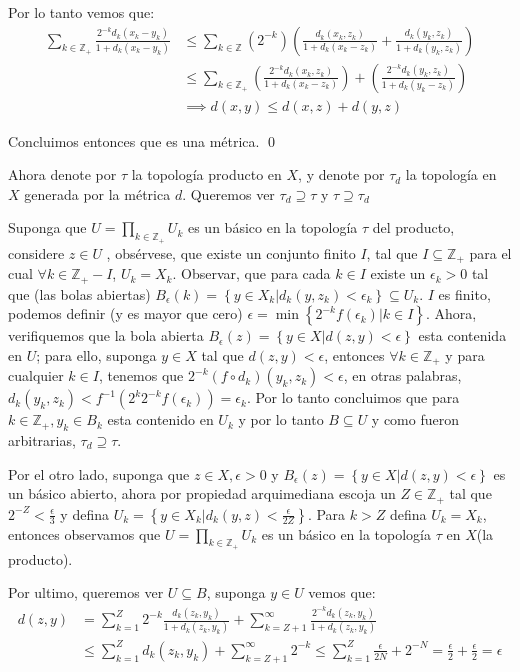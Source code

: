 \documentclass[]{article}
\newcommand{\lrp}[1]{\left( #1 \right)}
\newcommand{\set}[1]{\left\lbrace #1 \right\rbrace}
\newcommand{\ZZ}{\mathbb{Z}}
\newcommand{\contained}{\subseteq}
\begin{document}
Por lo tanto vemos que:
\begin{align*}
\sum_{k \in \ZZ_+}^{} \frac{2^{-k}d_k(x_k-y_k)}{1+d_k(x_k-y_k)} &\leq \sum_{k \in \ZZ}^{}\lrp{2^{-k}}\lrp{\frac{d_k(x_k,z_k)}{1+d_k(x_k - z_k)} + \frac{d_k(y_k,z_k)}{1+d_k(y_k,z_k)}}  \\
&\leq \sum_{k \in \ZZ_+}^{} \lrp{\frac{2^{-k}d_k(x_k,z_k)}{1+d_k(x_k - z_k)}} + \lrp{\frac{2^{-k}d_k(y_k,z_k)}{1+d_k(y_k - z_k)}} \\
&\implies d(x,y) \leq d(x,z) + d(y,z)
\end{align*}


Concluimos entonces que es una métrica. \qed


Ahora denote por $ \tau $ la topología producto  en $X$, y denote por $ \tau_d $ la topología en $X$ generada por la métrica $d$. Queremos ver $  \tau_d \supseteq \tau $ y $ \tau \supseteq \tau_d $

Suponga que $  U = \prod_{k \in \ZZ_+}^{}U_k $ es un básico en la topología $ \tau $ del producto, considere $ z \in U $ , obsérvese, que existe un conjunto finito $ I $, tal que $ I \contained \ZZ_+ $ para el cual $ \forall k \in \ZZ_+ - I $, $ U_k = X_k $.  Observar, que para cada $ k \in I $ existe un $ \epsilon_k > 0 $ tal que (las bolas abiertas) $ B_\epsilon(k) = \set{ y \in X_k | d_k(y,z_k) < \epsilon_k} \contained U_k$. $ I $ es finito, podemos definir (y es mayor que cero) $ \epsilon = \operatorname{min}\set{2^{-k} f(\epsilon_k)| k \in I} $. Ahora, verifiquemos que la bola abierta $ B_\epsilon(z) = \set{y \in X | d(z,y) < \epsilon} $ esta contenida en $ U $; para ello, suponga $ y \in X $ tal que $ d(z,y) < \epsilon $, entonces $ \forall k \in \ZZ_+ $ y para cualquier $ k \in I $, tenemos que $ 2^{-k}(f \circ d_k)(y_k,z_k)<\epsilon  $, en otras palabras, $ d_k(y_k,z_k) < f^{-1}(2^k2^{-k}f(\epsilon_k)) = \epsilon_k $. Por lo tanto concluimos que para $  k \in \ZZ_+, y_k \in B_k  $ esta contenido en $ U_k $ y por lo tanto $ B \contained U $ y como fueron arbitrarias, $ \tau_d \supseteq \tau $.

Por el otro lado, suponga que $ z \in X, \epsilon >0 $ y $ B_\epsilon(z) = \set{y \in X | d(z,y) < \epsilon} $ es un básico abierto, ahora por propiedad arquimediana escoja un $ Z \in \ZZ_+ $ tal que $ 2^{-Z} < \frac{\epsilon}{3} $ y defina $ U_k = \set{y \in X_k | d_k(y,z) < \frac{\epsilon}{2Z}} $. Para $ k > Z $ defina $ U_k = X_k $, entonces observamos que $ U = \prod_{k \in \ZZ_+}^{} U_k$ es un básico en la topología $ \tau $ en $ X $(la producto).

Por ultimo, queremos ver $ U \contained B $, suponga $ y \in U $ vemos que:
\begin{align*}
d(z,y) &= \sum_{k=1}^{Z}2^{-k}\frac{d_k(z_k,y_k)}{1+d_k(z_k,y_k)} + \sum_{k = Z+1}^{\infty}\frac{2^{-k}d_k(z_k,y_k)}{1+d_k(z_k,y_k)} \\
&\leq \sum_{k =1}^{Z} d_k(z_k,y_k) + \sum_{k = Z+1}^{\infty}2^{-k} \leq \sum_{k=1}^{Z}\frac{\epsilon}{2N} + 2^{-N} = \frac{\epsilon}{2} + \frac{\epsilon}{2} = \epsilon
\end{align*}
\end{document}
